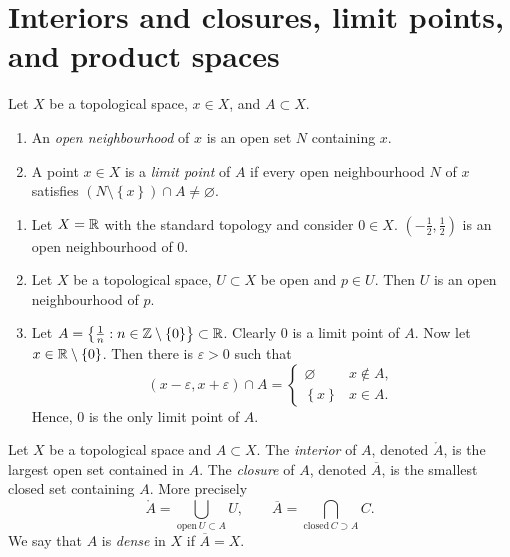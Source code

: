 
\section{Interiors and closures, limit points, and product spaces}

\begin{definition}[]
	Let $X$ be a topological space, $x \in X$, and $A \subset X$.
	\begin{enumerate}
		\item An \emph{open neighbourhood} of $x$ is an open set $N$ containing
			$x$.

		\item A point $x \in X$ is a \emph{limit point} of $A$ if every open
			neighbourhood $N$ of $x$ satisfies 
			$(N  \setminus \left\{ x \right\}) \cap A \neq \varnothing$.
	\end{enumerate}
\end{definition}

\begin{examples}
	\begin{enumerate}
		\item Let $X = \mathbb{R}$ with the standard topology and consider $0 \in X$.
			$\left( -\frac12, \frac12 \right)$ is an open neighbourhood of $0$.

		\item Let $X$ be a topological space, $U \subset X$ be open and 
			$p \in U$.
			Then $U$ is an open neighbourhood of $p$.

		\item Let 
			$
				A = 
				\left\{ 
					\frac1n : n \in \mathbb{Z} \setminus \left\{ 0 \right\} 
				\right\} \subset \mathbb{R}
			$.
			Clearly $0$ is a limit point of $A$.
			Now let $x \in \mathbb{R} \setminus \left\{ 0 \right\}$.
			Then there is $\varepsilon > 0$ such that
			\[
				(x - \varepsilon, x + \varepsilon) \cap A =
				\begin{cases}
					\varnothing & x \not\in A, \\
					\left\{ x \right\} & x \in A.
				\end{cases}
			\]
			Hence, $0$ is the only limit point of $A$.
	\end{enumerate}
\end{examples}

\begin{definition}[]
	Let $X$ be a topological space and $A \subset X$.
	The \emph{interior} of $A$, denoted $\mathring A$, is the largest open set
	contained in $A$.
	The \emph{closure} of $A$, denoted $\overline A$,
	is the smallest closed set containing $A$.
	More precisely
	\[
		\mathring A =
		\bigcup_{\text{open}\, U \subset A} U, \qquad
		\overline A=
		\bigcap_{\text{closed}\, C \supset A} C.
	\]
	We say that $A$ is \emph{dense} in $X$ if $\overline A = X$.
\end{definition}

